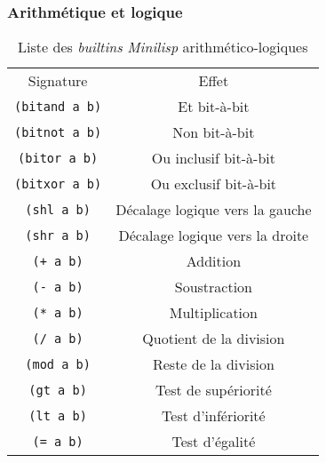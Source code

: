 \documentclass[c, 11pt, handout, xcolor=table]{beamer}
\newcommand{\codeLisp}[1]{\texttt{#1}}
\newcommand{\foreign}[1]{\emph{#1}}
\begin{document}
\begin{frame}
 \frametitle{Arithmétique et logique}
 
 \begin{table}[H]
  \centering
  \begin{tabularx}{\linewidth}{|C|C|}
    \hline
    Signature & Effet \tabularnewline
    \hhline{|=|=|}
    \codeLisp{(bitand a b)} & Et bit-à-bit \tabularnewline
    \hline
    \codeLisp{(bitnot a b)} & Non bit-à-bit \tabularnewline
    \hline
    \codeLisp{(bitor a b)} & Ou inclusif bit-à-bit \tabularnewline
    \hline
    \codeLisp{(bitxor a b)} & Ou exclusif bit-à-bit \tabularnewline
    \hhline{|=|=|}
    \codeLisp{(shl a b)} & Décalage logique vers la gauche \tabularnewline
    \hline
    \codeLisp{(shr a b)} & Décalage logique vers la droite \tabularnewline
    \hhline{|=|=|}
    \codeLisp{(+ a b)} & Addition \tabularnewline
    \hline
    \codeLisp{(- a b)} & Soustraction \tabularnewline
    \hline
    \codeLisp{(* a b)} & Multiplication \tabularnewline
    \hline
    \codeLisp{(/ a b)} & Quotient de la division \tabularnewline
    \hline
    \codeLisp{(mod a b)} & Reste de la division \tabularnewline
    \hhline{|=|=|}
    \codeLisp{(gt a b)} & Test de supériorité \tabularnewline
    \hline
    \codeLisp{(lt a b)} & Test d'infériorité \tabularnewline
    \hline
    \codeLisp{(= a b)} & Test d'égalité \tabularnewline
    \hline
  \end{tabularx}
  \caption{Liste des \foreign{builtins} \foreign{Minilisp} arithmético-logiques}
 \end{table}
\end{frame}
\end{document}
